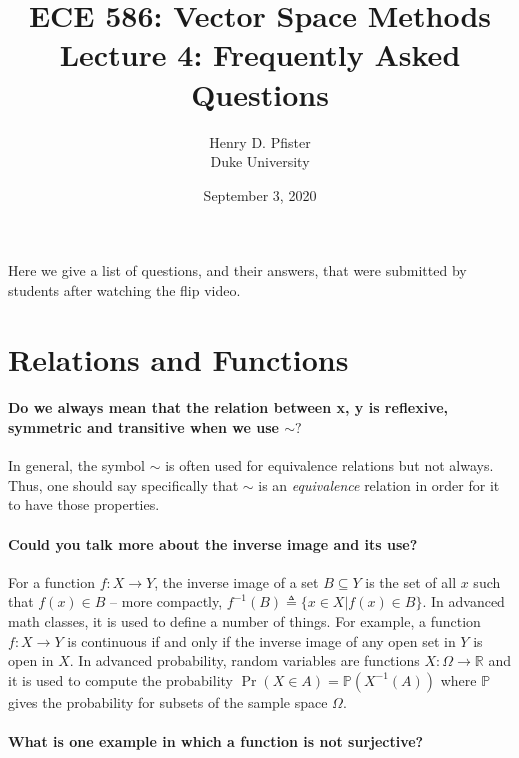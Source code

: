 \documentclass[10pt,english]{article}
\begin{document}
\title{ECE 586: Vector Space Methods \\ Lecture 4: Frequently Asked Questions}
\author{Henry D. Pfister \\ Duke University}
\date{September 3, 2020}

\maketitle

Here we give a list of questions, and their answers, that were submitted by students after watching the flip video.

\section{Relations and Functions}

\paragraph{Do we always mean that the relation between x, y is reflexive, symmetric and transitive when we use $\sim?$}

In general, the symbol $\sim$ is often used for equivalence relations but not always.  Thus, one should say specifically that $\sim$ is an \textit{equivalence} relation in order for it to have those properties.

\paragraph{Could you talk more about the inverse image and its use?}
For a function $f: X \rightarrow Y$, the inverse image of a set $B \subseteq Y$ is the set of all $x$ such that $f(x) \in B$ -- more compactly, $f^{-1}(B) \triangleq \{x\in X| f(x) \in B\}$.  In advanced math classes, it is used to define a number of things.  For example, a function $f: X \to Y$ is continuous if and only if the inverse image of any open set in $Y$ is open in $X$.  In advanced probability, random variables are functions $X: \Omega \to \mathbb{R}$ and it is used to compute the probability $\Pr (X \in A) = \mathbb{P}(X^{-1}(A))$ where $\mathbb{P}$ gives the probability for subsets of the sample space $\Omega$.

\paragraph{What is one example in which a function is not surjective?}
\end{document}
